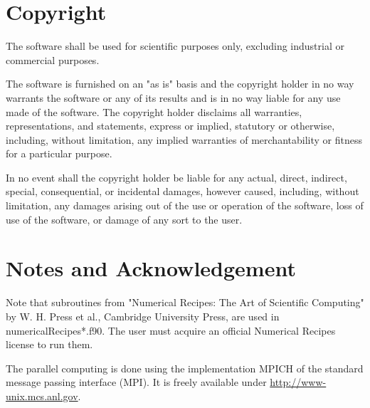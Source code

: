 \documentclass[a4paper,
                          headsepline,
                          listof=totoc,
                          toc=listof,
                          headings=small]{scrreprt} %
\begin{document}
\chapter{Copyright}

The software shall be used for scientific purposes only, excluding industrial or commercial purposes.

The software is furnished on an "as is" basis and the copyright holder in no way warrants
the software or any of its results and is in no way liable for any use made of the software.
The copyright holder disclaims all warranties, representations, and statements, express or implied, statutory or otherwise, including, without limitation, any implied warranties of
merchantability or fitness for a particular purpose.

In no event shall the copyright holder be liable for any actual, direct, indirect, special, consequential, or incidental damages, however caused, including, without limitation, any damages arising out of the use or operation of the software, loss of use of the software, or damage of any sort to the user.


\chapter{Notes and Acknowledgement}

Note that subroutines from "Numerical Recipes: The Art of Scientific Computing"
by W. H. Press et al., Cambridge University Press, are used in
numericalRecipes*.f90. The user must acquire an official
Numerical Recipes license to run them.

The parallel computing is done using the implementation MPICH of the standard message passing
interface (MPI). It is freely available under \href{http://www-unix.mcs.anl.gov}{http://www-unix.mcs.anl.gov}.


\end{document}
